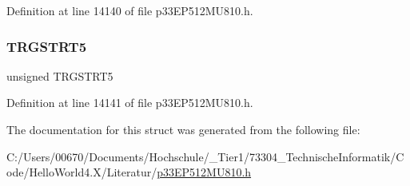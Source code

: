 Definition at line 14140 of file p33\+E\+P512\+M\+U810.\+h.

\mbox{\label{structtag_t_r_g_c_o_n1_b_i_t_s_aabeb06bb6258310e01e1a0cd96bf30ca}} 
\subsubsection{\texorpdfstring{T\+R\+G\+S\+T\+R\+T5}{TRGSTRT5}}
{\footnotesize\ttfamily unsigned T\+R\+G\+S\+T\+R\+T5}



Definition at line 14141 of file p33\+E\+P512\+M\+U810.\+h.



The documentation for this struct was generated from the following file\+:\begin{DoxyCompactItemize}
\item 
C\+:/\+Users/00670/\+Documents/\+Hochschule/\+\_\+\+Tier1/73304\+\_\+\+Technische\+Informatik/\+Code/\+Hello\+World4.\+X/\+Literatur/\hyperlink{p33_e_p512_m_u810_8h}{p33\+E\+P512\+M\+U810.\+h}\end{DoxyCompactItemize}
